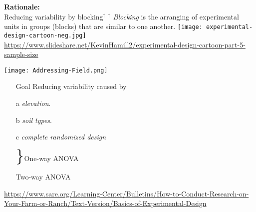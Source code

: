 
\begin{frame}
	\begin{center}
		{\bf Rationale:}\\[1em]Reducing variability by blocking$^\dagger$
		\vfill
		{\small {\it $^\dagger$ Blocking} is the arranging of experimental units in groups (blocks) that are similar to one another.}
		\vfill
		\texttt{[image: experimental-design-cartoon-neg.jpg]}
		\vfill
		{\footnotesize
		\url{https://www.slideshare.net/KevinHamill2/experimental-design-cartoon-part-5-sample-size}}
	\end{center}
\end{frame}
\begin{frame}[fragile]
	\centering
	\texttt{[image: Addressing-Field.png]}
	\vfill

	\begin{minipage}{0.6\textwidth}
	\begin{enumerate}
	\item[Goal] Reducing variability caused by
	\item[a]  {\it elevation}.
	\item[b]  {\it soil types}.
	\item[]  
	\item[c] {\it complete randomized design}
	\end{enumerate}
	\end{minipage}
\hfill\pause
	\begin{minipage}{0.35\textwidth}
		\vspace{1.8em}
	\begin{enumerate}
	\item[]
		$\scalebox{2.2}{\}}$\hfill One-way ANOVA
		\vspace{1.4em}
	\item[]\hfill Two-way ANOVA
	\end{enumerate}
	\end{minipage}

	\vfill
	{\footnotesize\url{https://www.sare.org/Learning-Center/Bulletins/How-to-Conduct-Research-on-Your-Farm-or-Ranch/Text-Version/Basics-of-Experimental-Design}}
\end{frame}

